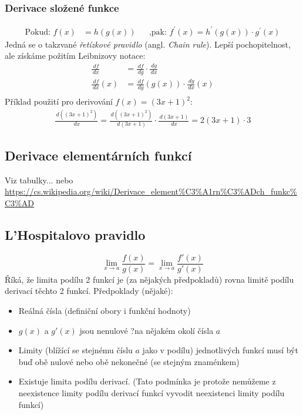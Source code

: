\documentclass[12pt]{article}
\begin{document}
\subsubsection{Derivace složené funkce}
\begin{align}
\text{Pokud: }f(x) &= h(g(x)) && \text{,pak: }
f^{\prime}(x) = h^{\prime}(g(x)) \cdot g^{\prime}(x)
\end{align}
Jedná se o takzvané \emph{řetízkové pravidlo} (angl. \emph{Chain rule}). Lepší pochopitelnost, ale získáme požitím Leibnizovy notace:
\begin{align}
\frac{\,df}{\,dx} &= \frac{\,df}{\,dg} \cdot \frac{\,dg}{\,dx}\\
\frac{\,df}{\,dx}(x) &= \frac{\,df}{\,dg}(g(x)) \cdot \frac{\,dg}{\,dx}(x)\\
\end{align}
Příklad použití pro derivování $f(x) = (3x+1)^2$:
\begin{align*}
\frac{\,d((3x+1)^2)}{\,dx} = \frac{\,d((3x+1)^2)}{\,d(3x+1)} \cdot \frac{\,d(3x+1)}{\,dx} = 2(3x+1) \cdot 3
\end{align*}
\subsection{Derivace elementárních funkcí}
\label{sec:der_vzorce}
Viz tabulky... nebo \url{https://cs.wikipedia.org/wiki/Derivace_element\%C3\%A1rn\%C3\%ADch_funkc\%C3\%AD}
\subsection{L'Hospitalovo pravidlo}
\label{sec:hospital_pravidlo}
\begin{equation}
\lim_{x \to a} \frac{f(x)}{g(x)} = \lim_{x \to a} \frac{f'(x)}{g'(x)}
\end{equation}
Říká, že limita podílu 2 funkcí je (za nějakých předpokladů) rovna limitě podílu derivací těchto 2 funkcí. Předpoklady (nějaké):
\begin{itemize}
\item Reálná čísla (definiční obory i funkční hodnoty)
\item $g(x)$ a $g'(x)$ jsou nenulové ?na nějakém okolí čísla $a$
\item Limity (blížící se stejnému číslu $a$ jako v podílu) jednotlivých funkcí musí být buď obě nulové nebo obě nekonečné (se stejným znaménkem)
\item Existuje limita podílu derivací. (Tato podmínka je protože nemůžeme z neexistence limity podílu derivací funkcí vyvodit neexistenci limity podílu funkcí)
\end{itemize}
\end{document}
